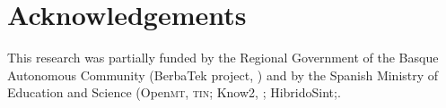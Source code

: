 \documentclass[output=paper]{LSP/langsci}
\begin{document}
\section*{Acknowledgements}\label{sec:leturia:7}
\largerpage
This research was partially funded by the Regional Government of the Basque Autonomous Community (BerbaTek project, \textsc{}) and by the Spanish Ministry of Education and Science (Open\textsc{mt}, \textsc{tin}; Know2, \textsc{}; HibridoSint;\textsc{}.

\sloppy
\printbibliography[heading=subbibliography,notkeyword=this]
\end{document}
